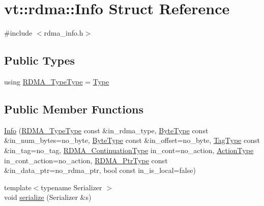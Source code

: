\hypertarget{structvt_1_1rdma_1_1_info}{}\section{vt\+:\+:rdma\+:\+:Info Struct Reference}
\label{structvt_1_1rdma_1_1_info}


{\ttfamily \#include $<$rdma\+\_\+info.\+h$>$}

\subsection*{Public Types}
\begin{DoxyCompactItemize}
\item 
using \hyperlink{structvt_1_1rdma_1_1_info_afb608063c839ec0e8e124f3496542991}{R\+D\+M\+A\+\_\+\+Type\+Type} = \hyperlink{namespacevt_1_1rdma_ac848e1d9da43db6294bd06f83e5d3946}{Type}
\end{DoxyCompactItemize}
\subsection*{Public Member Functions}
\begin{DoxyCompactItemize}
\item 
\hyperlink{structvt_1_1rdma_1_1_info_a9f79490fb7f166889a8cfed10d158d38}{Info} (\hyperlink{namespacevt_1_1rdma_ac848e1d9da43db6294bd06f83e5d3946}{R\+D\+M\+A\+\_\+\+Type\+Type} const \&in\+\_\+rdma\+\_\+type, \hyperlink{namespacevt_aab8d55968084610ce3b17057981e9300}{Byte\+Type} const \&in\+\_\+num\+\_\+bytes=no\+\_\+byte, \hyperlink{namespacevt_aab8d55968084610ce3b17057981e9300}{Byte\+Type} const \&in\+\_\+offset=no\+\_\+byte, \hyperlink{namespacevt_a84ab281dae04a52a4b243d6bf62d0e52}{Tag\+Type} const \&in\+\_\+tag=no\+\_\+tag, \hyperlink{namespacevt_a9880273f1697d78c2171f8d8f044de51}{R\+D\+M\+A\+\_\+\+Continuation\+Type} in\+\_\+cont=no\+\_\+action, \hyperlink{namespacevt_ae0a5a7b18cc99d7b732cb4d44f46b0f3}{Action\+Type} in\+\_\+cont\+\_\+action=no\+\_\+action, \hyperlink{namespacevt_aab05b4a584f7ee835a6d0f66915cf59b}{R\+D\+M\+A\+\_\+\+Ptr\+Type} const \&in\+\_\+data\+\_\+ptr=no\+\_\+rdma\+\_\+ptr, bool const in\+\_\+is\+\_\+local=false)
\item 
{\footnotesize template$<$typename Serializer $>$ }\\void \hyperlink{structvt_1_1rdma_1_1_info_ac1e3590cb31c738ed6d3cedce09701c6}{serialize} (Serializer \&s)
\end{DoxyCompactItemize}
